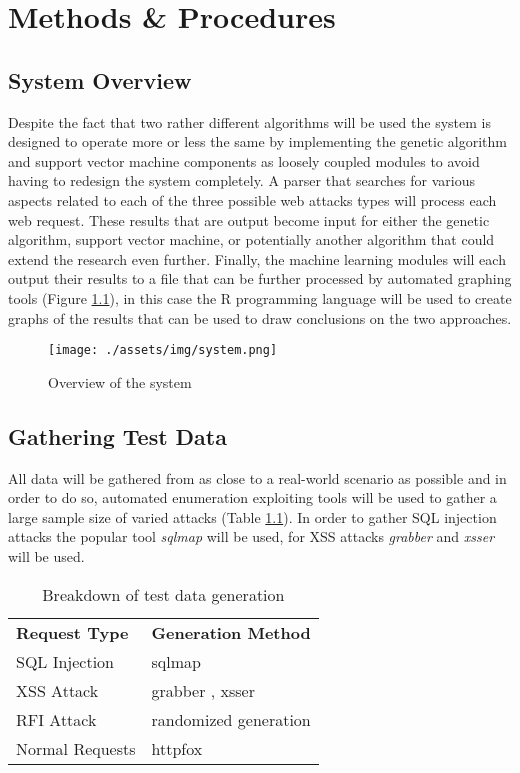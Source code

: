 \chapter{Methods \& Procedures} \label{sec:sectionFive}

\section{System Overview} \label{sec:systemOverview}

Despite the fact that two rather different algorithms will be used the system is designed to operate more or less the same by implementing the genetic algorithm and support vector machine components as loosely coupled modules to avoid having to redesign the system completely.  A parser that searches for various aspects related to each of the three possible web attacks types will process each web request.  These results that are output become input for either the genetic algorithm, support vector machine, or potentially another algorithm that could extend the research even further.  Finally, the machine learning modules will each output their results to a file that can be further processed by automated graphing tools (Figure \ref{fig:sys}), in this case the R programming language will be used to create graphs of the results that can be used to draw conclusions on the two approaches.

\begin{figure}
	\texttt{[image: ./assets/img/system.png]}
	\caption{Overview of the system}
	\label{fig:sys}
\end{figure}

\section{Gathering Test Data} \label{sec:gatheringTestData}

All data will be gathered from as close to a real-world scenario as possible and in order to do so, automated enumeration exploiting tools will be used to gather a large sample size of varied attacks (Table \ref{tab:tools}).  In order to gather SQL injection attacks the popular tool \textit{sqlmap} will be used, for XSS attacks \textit{grabber} and \textit{xsser} will be used.

\begin{table}
	\centering
	\begin{tabular}{|l|l|}
	\hline
		\textbf{Request Type} & \textbf{Generation Method}\\
	\hhline{|=|=|}
		SQL Injection & sqlmap \cite{sqlmap} \\
	\hline
		XSS Attack & grabber \cite{grabber}, xsser \cite{xsser} \\
	\hline
		RFI Attack & randomized generation \\
	\hline
		Normal Requests & httpfox \cite{httpfox} \\
	\hline
	\end{tabular}
	\caption{Breakdown of test data generation}
	\label{tab:tools}
\end{table}

